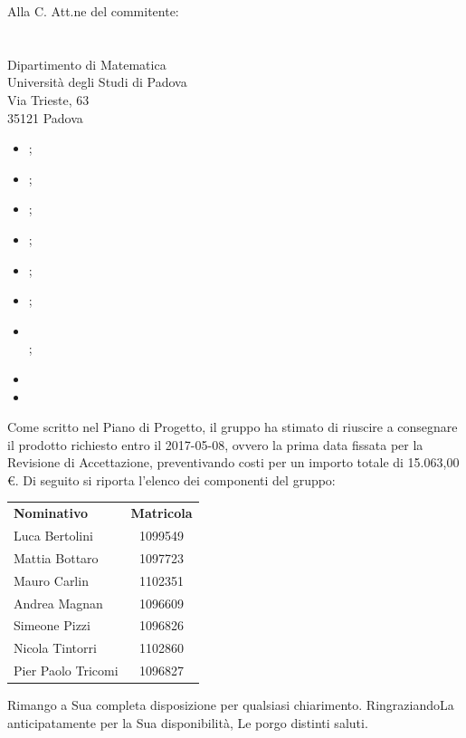 \documentclass[a4paper,12pt]{letteracdp}
\begin{document}
\begin{letter}{
    Alla C. Att.ne del commitente: \\
    \COMMITTENTE \\
    \CARDIN      \\
    Dipartimento di Matematica \\
		Università degli Studi di Padova \\
		Via Trieste, 63 \\
		35121 Padova}
    \begin{itemize}
      \item \Gldoc{} \Glfile{};
      \item \NPdoc{} \NPfile{};
      \item \SFdoc{} \SFfile{};
      \item \PPdoc{} \PPfile{};
      \item \PQdoc{} \PQfile{};
      \item \ARdoc{} \ARfile{};
      \item \SDKdoc{} \\ \SDKfile{};
      \item {} 
      \item {} 
    \end{itemize}
    Come scritto nel Piano di Progetto, il gruppo ha stimato di riuscire a
    consegnare il prodotto richiesto entro il 2017-05-08, ovvero la prima data
    fissata per la Revisione di Accettazione, preventivando costi per un importo
    totale di 15.063,00 \euro.
    \newpage
    Di seguito si riporta l'elenco dei componenti del gruppo:\\
    \begin{center}
      \begin{tabular}{l c}
        \textbf{Nominativo} & \textbf{Matricola} \\
        Luca Bertolini 	 	& 1099549  \\
        Mattia Bottaro 	 	& 1097723  \\
        Mauro Carlin 	 	& 1102351  \\
        Andrea Magnan    	& 1096609  \\
        Simeone Pizzi    	& 1096826  \\
        Nicola Tintorri    	& 1102860  \\
        Pier Paolo Tricomi 	& 1096827  \\
      \end{tabular}
    \end{center}
    \closing{Rimango a Sua completa disposizione per qualsiasi chiarimento.
		RingraziandoLa anticipatamente per la Sua disponibilità, Le porgo distinti saluti.}
  \end{letter}
\end{document}
